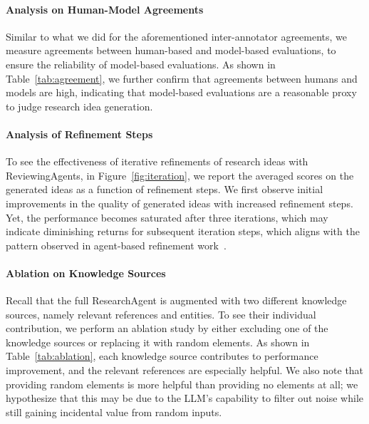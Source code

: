 


\paragraph{Analysis on Human-Model Agreements} Similar to what we did for the aforementioned inter-annotator agreements, we measure agreements between human-based and model-based evaluations, to ensure the reliability of model-based evaluations. As shown in Table~\ref{tab:agreement}, we further confirm that agreements between humans and models are high, indicating that model-based evaluations are a reasonable proxy to judge research idea generation. 

\paragraph{Analysis of Refinement Steps}
To see the effectiveness of iterative refinements of research ideas with ReviewingAgents, in Figure~\ref{fig:iteration}, we report the averaged scores on the generated ideas as a function of refinement steps. We first observe initial improvements in the quality of generated ideas with increased refinement steps. Yet, the performance becomes saturated after three iterations, which may indicate diminishing returns for subsequent iteration steps, which aligns with the pattern observed in agent-based refinement work~\cite{multiagent}.


\paragraph{Ablation on Knowledge Sources}
Recall that the full ResearchAgent is augmented with two different knowledge sources, namely relevant references and entities. To see their individual contribution, we perform an ablation study by either excluding one of the knowledge sources or replacing it with random elements. As shown in Table~\ref{tab:ablation}, each knowledge source contributes to performance improvement, and the relevant references are especially helpful. We also note that providing random elements is more helpful than providing no elements at all; we hypothesize that this may be due to the LLM's capability to filter out noise while still gaining incidental value from random inputs.




